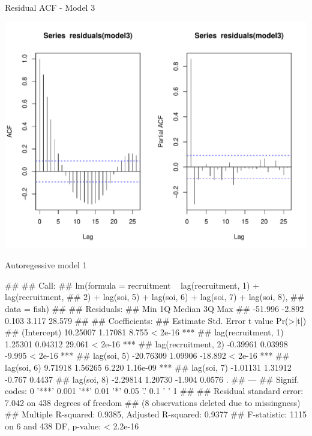 \documentclass[11pt,ignorenonframetext,]{beamer}
\let\oldverbatim\verbatim
\let\endoldverbatim\endverbatim
\renewenvironment{verbatim}{\footnotesize\begin{spacing}{0.9}\oldverbatim}{\endoldverbatim\end{spacing}}
\begin{document}
\begin{frame}{Residual ACF - Model 3}

\includegraphics{Lec7_files/figure-beamer/unnamed-chunk-9-1.pdf}

\end{frame}

\begin{frame}[fragile]{Autoregessive model 1}

\begin{verbatim}
## 
## Call:
## lm(formula = recruitment ~ lag(recruitment, 1) + lag(recruitment, 
##     2) + lag(soi, 5) + lag(soi, 6) + lag(soi, 7) + lag(soi, 8), 
##     data = fish)
## 
## Residuals:
##     Min      1Q  Median      3Q     Max 
## -51.996  -2.892   0.103   3.117  28.579 
## 
## Coefficients:
##                      Estimate Std. Error t value Pr(>|t|)    
## (Intercept)          10.25007    1.17081   8.755  < 2e-16 ***
## lag(recruitment, 1)   1.25301    0.04312  29.061  < 2e-16 ***
## lag(recruitment, 2)  -0.39961    0.03998  -9.995  < 2e-16 ***
## lag(soi, 5)         -20.76309    1.09906 -18.892  < 2e-16 ***
## lag(soi, 6)           9.71918    1.56265   6.220 1.16e-09 ***
## lag(soi, 7)          -1.01131    1.31912  -0.767   0.4437    
## lag(soi, 8)          -2.29814    1.20730  -1.904   0.0576 .  
## ---
## Signif. codes:  0 '***' 0.001 '**' 0.01 '*' 0.05 '.' 0.1 ' ' 1
## 
## Residual standard error: 7.042 on 438 degrees of freedom
##   (8 observations deleted due to missingness)
## Multiple R-squared:  0.9385, Adjusted R-squared:  0.9377 
## F-statistic:  1115 on 6 and 438 DF,  p-value: < 2.2e-16
\end{verbatim}

\end{frame}
\end{document}

